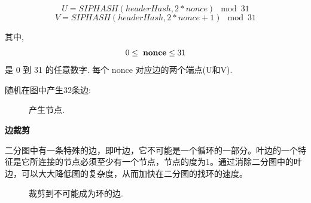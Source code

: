 \documentclass[a4paper,11pt]{article}
\begin{document}
\begin{equation}
{U = SIPHASH(headerHash, 2*nonce) \mod 31}
\end{equation}
\begin{equation}
{V = SIPHASH(headerHash, 2*nonce+1) \mod 31}
\end{equation}

其中,
\begin{equation}
0\leq\ {\bf nonce} \leq 31
\end{equation} 是 0 到 31 的任意数字. 每个 nonce 对应边的两个端点(U和V).

随机在图中产生32条边:

\begin{figure}[ht]
	\centerline{%
	}
	\caption{产生节点.}
\end{figure}


\textbf{边裁剪}


二分图中有一条特殊的边，即叶边，它不可能是一个循环的一部分。叶边的一个特征是它所连接的节点必须至少有一个节点，节点的度为1。通过消除二分图中的叶边，可以大大降低图的复杂度，从而加快在二分图的找环的速度。

\begin{figure}[ht]
	\centerline{%
	}
	\caption{裁剪到不可能成为环的边.}
\end{figure}
\end{document}
